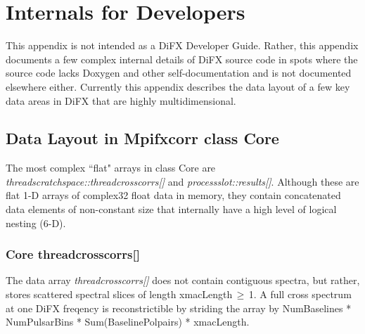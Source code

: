 \appendix

\section{Internals for Developers}

This appendix is not intended as a DiFX Developer Guide. Rather, this appendix documents a few complex internal details of DiFX source code in spots where the source code lacks Doxygen and other self-documentation and is not documented elsewhere either. Currently this appendix describes the data layout of a few key data areas in DiFX that are highly multidimensional.

\subsection{Data Layout in  Mpifxcorr class Core}

The most complex ``flat" arrays  in class Core are {\em threadscratchspace::threadcrosscorrs[]} and {\em processslot::results[]}. Although these are flat 1-D arrays of complex32 float data in memory, they contain concatenated data elements of non-constant size that internally have a high level of logical nesting (6-D).

\subsubsection{Core threadcrosscorrs[]}

The data array {\em threadcrosscorrs[]} does not contain contiguous spectra, but rather, stores scattered spectral slices of length xmacLength\,$\ge$\,1. A full cross spectrum at one DiFX freqency is reconstrictible by striding the array by NumBaselines * NumPulsarBins * Sum(BaselinePolpairs) * xmacLength.

